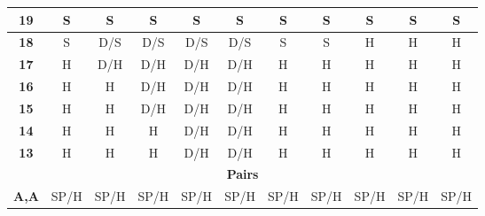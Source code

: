 \documentclass[conference]{IEEEtran}
\begin{document}
\begin{table}[htbp]
\begin{tabular}{|c|c|c|c|c|c|c|c|c|c|c|}
\textbf{19} & \cellcolor[HTML]{32CB00}S & \cellcolor[HTML]{32CB00}S & \cellcolor[HTML]{32CB00}S & \cellcolor[HTML]{32CB00}S & \cellcolor[HTML]{32CB00}S & \cellcolor[HTML]{32CB00}S & \cellcolor[HTML]{32CB00}S & \cellcolor[HTML]{32CB00}S & \cellcolor[HTML]{32CB00}S & \cellcolor[HTML]{32CB00}S \\ \hline
\textbf{18} & \cellcolor[HTML]{32CB00}S & \cellcolor[HTML]{FFC702}D/S & \cellcolor[HTML]{FFC702}D/S & \cellcolor[HTML]{FFC702}D/S & \cellcolor[HTML]{FFC702}D/S & \cellcolor[HTML]{32CB00}S & \cellcolor[HTML]{32CB00}S & \cellcolor[HTML]{FE0000}H & \cellcolor[HTML]{FE0000}H & \cellcolor[HTML]{FE0000}H \\ \hline
\textbf{17} & \cellcolor[HTML]{FE0000}H & \cellcolor[HTML]{FFC702}D/H & \cellcolor[HTML]{FFC702}D/H & \cellcolor[HTML]{FFC702}D/H & \cellcolor[HTML]{FFC702}D/H & \cellcolor[HTML]{FE0000}H & \cellcolor[HTML]{FE0000}H & \cellcolor[HTML]{FE0000}H & \cellcolor[HTML]{FE0000}H & \cellcolor[HTML]{FE0000}H \\ \hline
\textbf{16} & \cellcolor[HTML]{FE0000}H & \cellcolor[HTML]{FE0000}H & \cellcolor[HTML]{FFC702}D/H & \cellcolor[HTML]{FFC702}D/H & \cellcolor[HTML]{FFC702}D/H & \cellcolor[HTML]{FE0000}H & \cellcolor[HTML]{FE0000}H & \cellcolor[HTML]{FE0000}H & \cellcolor[HTML]{FE0000}H & \cellcolor[HTML]{FE0000}H \\ \hline
\textbf{15} & \cellcolor[HTML]{FE0000}H & \cellcolor[HTML]{FE0000}H & \cellcolor[HTML]{FFC702}D/H & \cellcolor[HTML]{FFC702}D/H & \cellcolor[HTML]{FFC702}D/H & \cellcolor[HTML]{FE0000}H & \cellcolor[HTML]{FE0000}H & \cellcolor[HTML]{FE0000}H & \cellcolor[HTML]{FE0000}H & \cellcolor[HTML]{FE0000}H \\ \hline
\textbf{14} & \cellcolor[HTML]{FE0000}H & \cellcolor[HTML]{FE0000}H & \cellcolor[HTML]{FE0000}H & \cellcolor[HTML]{FFC702}D/H & \cellcolor[HTML]{FFC702}D/H & \cellcolor[HTML]{FE0000}H & \cellcolor[HTML]{FE0000}H & \cellcolor[HTML]{FE0000}H & \cellcolor[HTML]{FE0000}H & \cellcolor[HTML]{FE0000}H \\ \hline
\textbf{13} & \cellcolor[HTML]{FE0000}H & \cellcolor[HTML]{FE0000}H & \cellcolor[HTML]{FE0000}H & \cellcolor[HTML]{FFC702}D/H & \cellcolor[HTML]{FFC702}D/H & \cellcolor[HTML]{FE0000}H & \cellcolor[HTML]{FE0000}H & \cellcolor[HTML]{FE0000}H & \cellcolor[HTML]{FE0000}H & \cellcolor[HTML]{FE0000}H \\ \hline
\multicolumn{11}{|c|}{\textbf{Pairs}} \\ \hline
\textbf{A,A} & \cellcolor[HTML]{F8FF00}SP/H & \cellcolor[HTML]{F8FF00}SP/H & \cellcolor[HTML]{F8FF00}SP/H & \cellcolor[HTML]{F8FF00}SP/H & \cellcolor[HTML]{F8FF00}SP/H & \cellcolor[HTML]{F8FF00}SP/H & \cellcolor[HTML]{F8FF00}SP/H & \cellcolor[HTML]{F8FF00}SP/H & \cellcolor[HTML]{F8FF00}SP/H & \cellcolor[HTML]{F8FF00}SP/H \\ \hline

\end{tabular}
\end{table}
\end{document}
